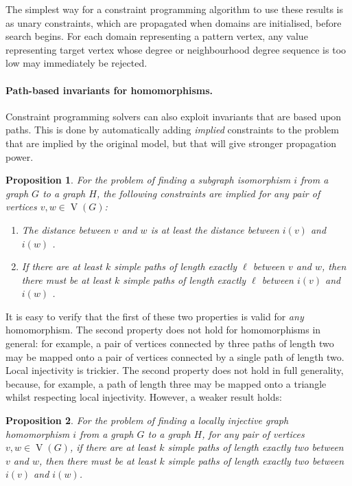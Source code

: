\documentclass{article}
\newtheorem{proposition}{Proposition}
\newcommand{\vertexset}{\operatorname{V}}
\begin{document}
The simplest way for a constraint programming algorithm to use these results is as unary
constraints, which are propagated when domains are initialised, before search begins. For each
domain representing a pattern vertex, any value representing target vertex whose degree or
neighbourhood degree sequence is too low may immediately be rejected.

\paragraph{Path-based invariants for homomorphisms.} Constraint programming solvers can also exploit
invariants that are based upon paths. This is done by automatically adding \emph{implied}
constraints to the problem that are implied by the original model, but that will give stronger
propagation power.

\begin{proposition}For the problem of finding a subgraph isomorphism $i$ from a graph $G$ to a graph
    $H$, the following constraints are implied for any pair of vertices $v, w \in \vertexset(G)$:
    \begin{enumerate}
        \item The distance between $v$ and $w$ is at least the distance between $i(v)$ and $i(w)$
            \cite{DBLP:conf/cp/AudemardLMGP14}.
        \item If there are at least $k$ simple
            paths of length exactly $\ell$ between $v$ and $w$, then there must be at least $k$
            simple paths of length exactly $\ell$ between $i(v)$ and $i(w)$
            \cite{DBLP:conf/cp/McCreeshP15}.
    \end{enumerate}
\end{proposition}

It is easy to verify that the first of these two properties is valid for \emph{any} homomorphism.
The second property does not hold for homomorphisms in general: for example, a pair of vertices
connected by three paths of length two may be mapped onto a pair of vertices connected by a single
path of length two. Local injectivity is trickier. The second property does not hold in full
generality, because, for example, a path of length three may be mapped onto a triangle whilst
respecting local injectivity. However, a weaker result holds:

\begin{proposition}For the problem of finding a locally injective graph homomorphism $i$ from a
    graph $G$ to a graph $H$, for any pair of vertices $v, w \in \vertexset(G)$, if there are at
    least $k$ simple paths of length exactly two between $v$ and $w$, then there must be at least
    $k$ simple paths of length exactly two between $i(v)$ and $i(w)$.
\end{proposition}
\end{document}
